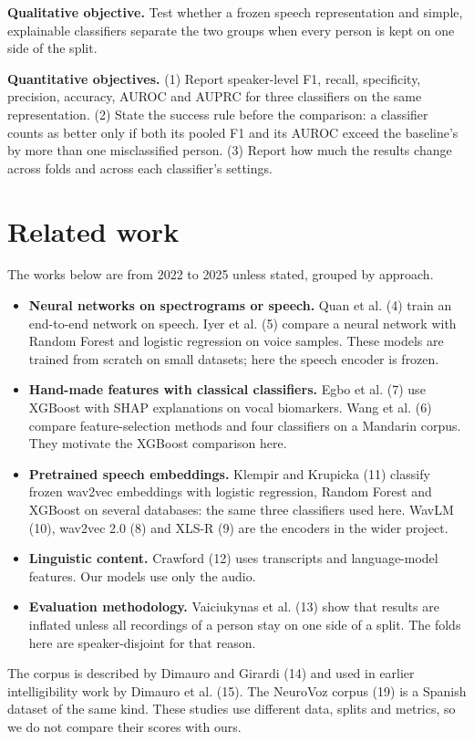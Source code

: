 \documentclass[11pt,a4paper]{article}
\begin{document}
\textbf{Qualitative objective.} Test whether a frozen speech representation and simple, explainable classifiers separate the two groups when every person is kept on one side of the split.

\textbf{Quantitative objectives.} (1) Report speaker-level F1, recall, specificity, precision, accuracy, AUROC and AUPRC for three classifiers on the same representation. (2) State the success rule before the comparison: a classifier counts as better only if both its pooled F1 and its AUROC exceed the baseline's by more than one misclassified person. (3) Report how much the results change across folds and across each classifier's settings.

\section{Related work}\label{sec:related}
The works below are from 2022 to 2025 unless stated, grouped by approach.

\begin{itemize}\item \textbf{Neural networks on spectrograms or speech.} Quan et al. (4) train an end-to-end network on speech. Iyer et al. (5) compare a neural network with Random Forest and logistic regression on voice samples. These models are trained from scratch on small datasets; here the speech encoder is frozen.
\item \textbf{Hand-made features with classical classifiers.} Egbo et al. (7) use XGBoost with SHAP explanations on vocal biomarkers. Wang et al. (6) compare feature-selection methods and four classifiers on a Mandarin corpus. They motivate the XGBoost comparison here.
\item \textbf{Pretrained speech embeddings.} Klempir and Krupicka (11) classify frozen wav2vec embeddings with logistic regression, Random Forest and XGBoost on several databases: the same three classifiers used here. WavLM (10), wav2vec 2.0 (8) and XLS-R (9) are the encoders in the wider project.
\item \textbf{Linguistic content.} Crawford (12) uses transcripts and language-model features. Our models use only the audio.
\item \textbf{Evaluation methodology.} Vaiciukynas et al. (13) show that results are inflated unless all recordings of a person stay on one side of a split. The folds here are speaker-disjoint for that reason.
\end{itemize}
The corpus is described by Dimauro and Girardi (14) and used in earlier intelligibility work by Dimauro et al. (15). The NeuroVoz corpus (19) is a Spanish dataset of the same kind. These studies use different data, splits and metrics, so we do not compare their scores with ours.
\end{document}
